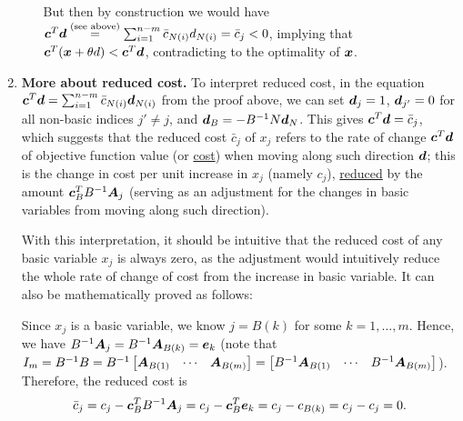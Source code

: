 \begin{enumerate}
\begin{pf}
\begin{enumerate}
But then by construction we would have
\(\bm{c}^{T}\bm{d}\overset{\text{(see above)}}{=}
\sum_{i=1}^{n-m}\bar{c}_{N(i)}d_{N(i)}=\bar{c}_j<0\), implying that
\(\bm{c}^{T}(\bm{x}+\theta d)<\bm{c}^{T}\bm{d}\), contradicting to the
optimality of \(\bm{x}\).
\end{enumerate}
\end{pf}


\item \label{it:reduced-cost} \textbf{More about reduced cost.} To interpret
reduced cost, in the equation
\(\bm{c}^{T}\bm{d}=\sum_{i=1}^{n-m}\bar{c}_{N(i)}\bm{d}_{N(i)}\) from the
proof above, we can set \(\bm{d}_{j}=1\), \(\bm{d}_{j'}=0\) for all
non-basic indices \(j'\ne j\), and \(\bm{d}_{B}=-B^{-1}N\bm{d}_{N}\). This
gives \(\bm{c}^{T}\bm{d}=\bar{c}_j\), which suggests that the reduced cost
\(\bar{c}_j\) of \(x_j\) refers to the rate of change \(\bm{c}^{T}\bm{d}\)
of objective function value (or \underline{cost}) when moving along such
direction \(\bm{d}\); this is the change in cost per unit increase in \(x_j\)
(namely \(c_j\)), \underline{reduced} by the amount
\(\bm{c}_{B}^{T}B^{-1}\bm{A}_j\) (serving as an adjustment for the changes
in basic variables from moving along such direction).

With this interpretation, it should be intuitive that the reduced cost of any
basic variable \(x_j\) is always zero, as the adjustment would intuitively
reduce the whole rate of change of cost from the increase in basic variable. It
can also be mathematically proved as follows:

\begin{pf}
Since \(x_j\) is a basic variable, we know \(j=B(k)\) for some
\(k=1,\dotsc,m\). Hence, we have \(B^{-1}\bm{A}_j
=B^{-1}\bm{A}_{B(k)}
=\bm{e}_k\)
(note that \(I_m=B^{-1}B=B^{-1}\begin{bmatrix}\bm{A}_{B(1)}&\cdots&\bm{A}_{B(m)}\end{bmatrix}
=\begin{bmatrix}B^{-1}\bm{A}_{B(1)}&\cdots&B^{-1}\bm{A}_{B(m)}\end{bmatrix}
\)). Therefore, the reduced cost is
\[
\bar{c}_{j}=c_j-\bm{c}_{B}^{T}B^{-1}\bm{A}_{j}
=c_j-\bm{c}_{B}^{T}\bm{e}_k
=c_j-c_{B(k)}
=c_j-c_j=0.
\]
\end{pf}


\end{enumerate}
